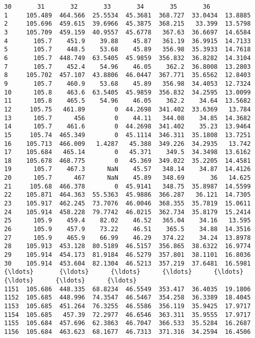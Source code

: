 \documentclass[11pt]{article}
\begin{document}
\begin{tcolorbox}[breakable, size=fbox, boxrule=.5pt, pad at break*=1mm, opacityfill=0]
\begin{Verbatim}[commandchars=\\\{\}]
           30       31       32       33       34       35       36
1     105.489  464.566  25.5534  45.3681  368.727  33.0434  13.8885
2     105.696  459.615  39.6966  45.3875  368.215   33.399  13.5798
3     105.709  459.159  40.9557  45.6778   367.63  36.6697  14.6584
4       105.7    451.9    39.88    45.87   361.19  36.9915  14.7133
5       105.7    448.5    53.68    45.89   356.98  35.3933  14.7618
6       105.7  448.749  63.5405  45.9859  356.832  36.8282  14.3104
7       105.7    452.4    54.96    46.05    362.2  36.8008  13.2803
8     105.702  457.107  43.8806  46.0447  367.771  35.6562  12.8403
9       105.7    460.9    53.68    45.89   356.98  34.4053  12.7324
10      105.8    463.6  63.5405  45.9859  356.832  34.2595  13.0099
11      105.8    465.5    54.96    46.05    362.2    34.64  13.5682
12     105.75   461.89        0  44.2698  341.402  33.6369   13.784
13      105.7      456        0    44.11   344.08    34.85  14.3682
14      105.7    461.6        0  44.2698  341.402    35.23  13.9464
15     105.74  465.349        0  45.1114  346.311  35.1808  13.7251
16    105.713  466.009   1.4287   45.388  349.226  34.2935   13.742
17    105.684   465.14        0   45.371    349.5  34.3498  13.6162
18    105.678  468.775        0   45.369  349.022  35.2205  14.4581
19      105.7    467.3      NaN    45.57   348.14    34.87  14.4126
20      105.7      467      NaN    45.89   348.69       36   14.625
21     105.68  466.378        0  45.9141   348.75  35.8987  14.5599
22    105.871  464.363  55.5363  45.9886  366.287   36.121  14.7305
23    105.917  462.245  73.7076  46.0046  368.355  35.7819  15.0611
24    105.914  458.228  79.7742  46.0215  362.734  35.8179  15.2414
25      105.9    459.4    82.02    46.52   365.04    34.16   13.595
26      105.9    457.9    73.22    46.51    365.5    34.88  14.3516
27      105.9    465.9    66.99    46.29   374.22    34.24  13.8978
28    105.913  453.128  80.5189  46.5157  356.865  38.6322  16.9774
29    105.914  454.173  81.9184  46.5279  357.801  38.1101  16.8036
30    105.914  453.604  82.1304  46.5213  357.219  37.6481  16.5981
{\ldots}       {\ldots}      {\ldots}      {\ldots}      {\ldots}      {\ldots}      {\ldots}      {\ldots}
1151  105.686  448.335  68.8234  46.5549  353.417  36.4035  19.1806
1152  105.685  448.996  74.3547  46.5467  354.258  36.3389  18.4045
1153  105.685  451.264  76.3255  46.5586  356.119  35.9425  17.9717
1154  105.685   457.39  72.2977  46.6546  363.311  35.9555  17.9717
1155  105.684  457.696  62.3863  46.7047  366.533  35.5284  16.2687
1156  105.684  463.623  68.1677  46.7313  371.316  34.2594  16.4506

\end{Verbatim}
\end{tcolorbox}
\end{document}
